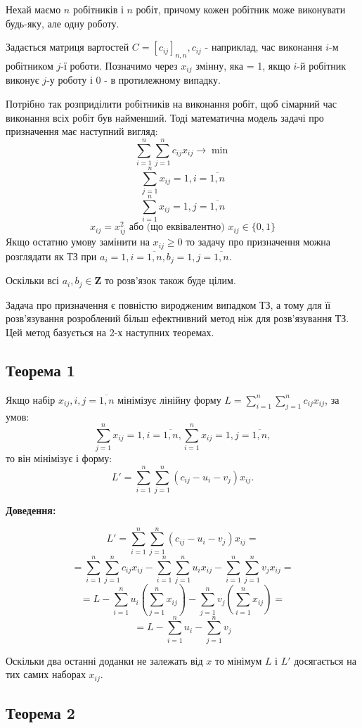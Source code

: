 \documentclass[12pt,a4paper]{book}
\begin{document}
Нехай маємо $n$ робітників і $n$ робіт, причому кожен робітник може виконувати будь-яку, але одну роботу.

Задається матриця вартостей $C=[c_{ij}]_{n,n}, c_{ij}$ - наприклад, час виконання $i$-м робітником $j$-ї роботи. Позначимо через $x_{ij}$ змінну, яка = 1, якщо $i$-й робітник виконує $j$-у роботу і 0 - в протилежному випадку.

Потрібно так розприділити робітників на виконання робіт, щоб сімарний час виконання всіх робіт був найменший. Тоді математична модель задачі про призначення має наступний вигляд:
\[ \sum_{i=1}^n \sum_{j=1}^n c_{ij} x_{ij} \to \min \]
\[ \sum_{j=1}^n x_{ij} = 1, i = \overline{1,n} \]
\[ \sum_{i=1}^n x_{ij} = 1, j = \overline{1,n} \]
\[ x_{ij} = x_{ij}^2 \mbox{ або (що еквівалентно) } x_{ij} \in \{0,1\} \]
Якщо остатню умову замінити на $x_{ij} \geq 0$ то задачу про призначення можна розглядати як ТЗ при $a_i=1, i = \overline{1,n}, b_j=1, j = \overline{1,n}$.

Оскільки всі $a_i, b_j \in \mathbf{Z}$ то розв’язок також буде цілим.

Задача про призначення є повністю виродженим випадком ТЗ, а тому для її розв’язування розроблений більш ефектнивний метод ніж для розв’язування ТЗ. Цей метод базується на 2-х наступних теоремах.

\subsection{Теорема 1}

Якщо набір $x_{ij}, i,j=\overline{1,n}$ мінімізує лінійну форму $ L = \sum_{i=1}^n \sum_{j=1}^n c_{ij} x_{ij} $, за умов:
\[ \sum_{j=1}^n x_{ij} = 1, i = \overline{1,n},  \sum_{i=1}^n x_{ij} = 1, j = \overline{1,n}, \]
то він мінімізує і форму:
\[ L' = \sum_{i=1}^n \sum_{j=1}^n (c_{ij} - u_i - v_j) x_{ij}. \]

{\bf Доведення:}

\[ L' = \sum_{i=1}^n \sum_{j=1}^n (c_{ij} - u_i - v_j) x_{ij} = \]
\[ = \sum_{i=1}^n \sum_{j=1}^n c_{ij} x_{ij} - \sum_{i=1}^n \sum_{j=1}^n u_i x_{ij} - \sum_{i=1}^n \sum_{j=1}^n v_j x_{ij} = \]
\[ = L - \sum_{i=1}^n u_i (\sum_{j=1}^n x_{ij}) - \sum_{j=1}^n v_j (\sum_{i=1}^n x_{ij}) = \]
\[ = L - \sum_{i=1}^n u_i - \sum_{j=1}^n v_j \]

Оскільки два останні доданки не залежать від $x$ то мінімум $L$ і $L'$ досягається на тих самих наборах $x_{ij}$.

\subsection{Теорема 2}
\end{document}
